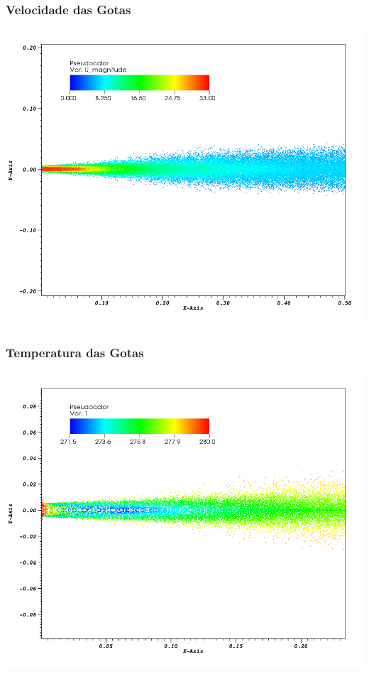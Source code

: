 \documentclass[bars,mathserif]{beamer}
\begin{document}
\begin{frame}[plain]
\frametitle{Velocidade das Gotas}
\begin{center}
\includegraphics[height=\textheight]{./imgs/visit/drop_U.png}
\end{center}
\end{frame}
%
\begin{frame}[plain]
\frametitle{Temperatura das Gotas}
\begin{center}
\includegraphics[height=\textheight]{./imgs/visit/drop_T.png}
\end{center}
\end{frame}
%
\end{document}
